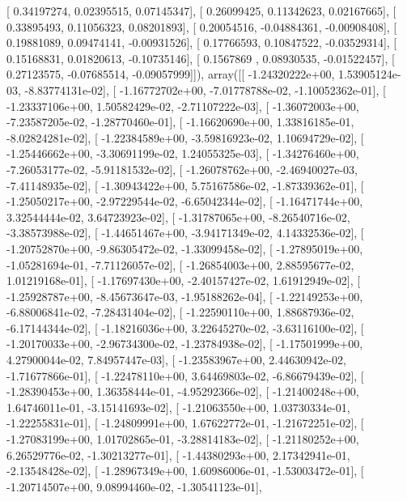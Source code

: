 \documentclass{article}
\begin{document}
       [ 0.34197274,  0.02395515,  0.07145347],
       [ 0.26099425,  0.11342623,  0.02167665],
       [ 0.33895493,  0.11056323,  0.08201893],
       [ 0.20054516, -0.04884361, -0.00908408],
       [ 0.19881089,  0.09474141, -0.00931526],
       [ 0.17766593,  0.10847522, -0.03529314],
       [ 0.15168831,  0.01820613, -0.10735146],
       [ 0.1567869 ,  0.08930535, -0.01522457],
       [ 0.27123575, -0.07685514, -0.09057999]]), array([[ -1.24320222e+00,   1.53905124e-03,  -8.83774131e-02],
       [ -1.16772702e+00,  -7.01778788e-02,  -1.10052362e-01],
       [ -1.23337106e+00,   1.50582429e-02,  -2.71107222e-03],
       [ -1.36072003e+00,  -7.23587205e-02,  -1.28770460e-01],
       [ -1.16620690e+00,   1.33816185e-01,  -8.02824281e-02],
       [ -1.22384589e+00,  -3.59816923e-02,   1.10694729e-02],
       [ -1.25446662e+00,  -3.30691199e-02,   1.24055325e-03],
       [ -1.34276460e+00,  -7.26053177e-02,  -5.91181532e-02],
       [ -1.26078762e+00,  -2.46940027e-03,  -7.41148935e-02],
       [ -1.30943422e+00,   5.75167586e-02,  -1.87339362e-01],
       [ -1.25050217e+00,  -2.97229544e-02,  -6.65042344e-02],
       [ -1.16471744e+00,   3.32544444e-02,   3.64723923e-02],
       [ -1.31787065e+00,  -8.26540716e-02,  -3.38573988e-02],
       [ -1.44651467e+00,  -3.94171349e-02,   4.14332536e-02],
       [ -1.20752870e+00,  -9.86305472e-02,  -1.33099458e-02],
       [ -1.27895019e+00,  -1.05281694e-01,  -7.71126057e-02],
       [ -1.26854003e+00,   2.88595677e-02,   1.01219168e-01],
       [ -1.17697430e+00,  -2.40157427e-02,   1.61912949e-02],
       [ -1.25928787e+00,  -8.45673647e-03,  -1.95188262e-04],
       [ -1.22149253e+00,  -6.88006841e-02,  -7.28431404e-02],
       [ -1.22590110e+00,   1.88687936e-02,  -6.17144344e-02],
       [ -1.18216036e+00,   3.22645270e-02,  -3.63116100e-02],
       [ -1.20170033e+00,  -2.96734300e-02,  -1.23784938e-02],
       [ -1.17501999e+00,   4.27900044e-02,   7.84957447e-03],
       [ -1.23583967e+00,   2.44630942e-02,  -1.71677866e-01],
       [ -1.22478110e+00,   3.64469803e-02,  -6.86679439e-02],
       [ -1.28390453e+00,   1.36358444e-01,  -4.95292366e-02],
       [ -1.21400248e+00,   1.64746011e-01,  -3.15141693e-02],
       [ -1.21063550e+00,   1.03730334e-01,  -1.22255831e-01],
       [ -1.24809991e+00,   1.67622772e-01,  -1.21672251e-02],
       [ -1.27083199e+00,   1.01702865e-01,  -3.28814183e-02],
       [ -1.21180252e+00,   6.26529776e-02,  -1.30213277e-01],
       [ -1.44380293e+00,   2.17342941e-01,  -2.13548428e-02],
       [ -1.28967349e+00,   1.60986006e-01,  -1.53003472e-01],
       [ -1.20714507e+00,   9.08994460e-02,  -1.30541123e-01],
\end{document}
